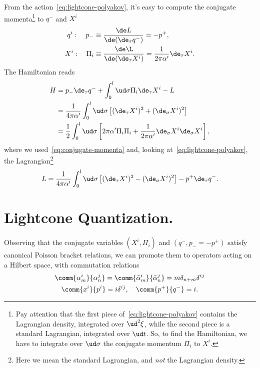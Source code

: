 From the action~\eqref{eq:lightcone-polyakov}, it's easy to compute the conjugate momenta\footnote{Pay attention that the first piece of~\eqref{eq:lightcone-polyakov} contains the Lagrangian density, integrated over $\ud^2 \xi$, while the second piece is a standard Lagrangian, integrated over $\ud t$. So, to find the Hamiltonian, we have to integrate over $\ud \sigma$ the conjugate momentum $\Pi_i$ to $X^i$.} to $q^-$ and $X^i$
\begin{subequations}\label{eq:conjugate-momenta}
\begin{align}
    q^i: \quad p_- &\equiv \frac{\de L}{\de(\de_\tau q^-)} = - p^+, \\
    X^i: \quad \Pi_i &\equiv \frac{\de \L}{\de(\de_\tau X^i)} = \frac{1}{2\pi\alpha'} \de_\tau X^i .
\end{align}
\end{subequations}
The Hamiltonian reads
\begin{equation}\label{eq:lightcone-hamiltonian}
\begin{split}
    H &= p_- \de_\tau q^- + \int_0^l \ud \sigma \Pi_i \de_\tau X^i - L \\
    &= \frac{1}{4\pi\alpha'} \int_0^l \ud \sigma \left[ (\de_\tau X^i)^2 + (\de_\sigma X^i)^2 \right] \\ 
    &= \frac{1}{2} \int_0^l \ud \sigma \left[ 2\pi\alpha' \Pi_i \Pi_i + \frac{1}{2\pi\alpha'} \de_\sigma X^i \de_\sigma X^i \right],
\end{split}
\end{equation}
where we used~\eqref{eq:conjugate-momenta} and, looking at~\eqref{eq:lightcone-polyakov}, the Lagrangian\footnote{Here we mean the standard Lagrangian, and \emph{not} the Lagrangian density.}
\begin{equation}
    L = \frac{1}{4\pi\alpha'} \int_0^l \ud \sigma \left[ (\de_\tau X^i)^2 - (\de_\sigma X^i)^2 \right] - p^+ \de_\tau q^- .
\end{equation}


\section{Lightcone Quantization.}\label{sec:bosonic-quant}
Observing that the conjugate variables $(X^i, \Pi_i)$ and $(q^-,p_- = - p^+)$ satisfy canonical Poisson bracket relations, we can promote them to operators acting on a Hilbert space, with commutation relations
\begin{gather}
    \comm{\alpha^i_m}{\alpha^j_n} = \comm{\tilde{\alpha}^i_m}{\tilde{\alpha}^j_n} = m \delta_{n+m} \delta^{ij} \\
    \comm{x^i}{p^i} = i \delta^{ij}, \quad \comm{p^+}{q^-} = i .
\end{gather}

